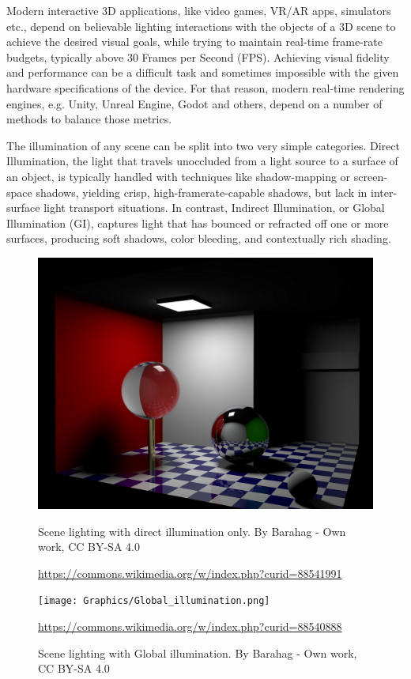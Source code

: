 Modern interactive 3D applications, like video games, VR/AR apps, simulators etc., depend on believable lighting interactions with the objects of a 3D scene to achieve the desired visual goals, while trying to maintain real-time frame-rate budgets, typically above 30 Frames per Second (FPS). Achieving visual fidelity and performance can be a difficult task and sometimes impossible with the given hardware specifications of the device. For that reason, modern real-time rendering engines, e.g. Unity, Unreal Engine, Godot and others, depend on a number of methods to balance those metrics. 

The illumination of any scene can be split into two very simple categories. Direct Illumination, the light that travels unoccluded from a light source to a surface of an object, is typically handled with techniques like shadow-mapping or screen-space shadows, yielding crisp, high-framerate-capable shadows, but lack in inter-surface light transport situations. In contrast, Indirect Illumination, or Global Illumination (GI), captures light that has bounced or refracted off one or more surfaces, producing soft shadows, color bleeding, and contextually rich shading. 

\begin{figure}[!htb]
	\begin{minipage}{0.48\textwidth}
		\centering
		\includegraphics[scale=0.65]{Graphics/Direct_lighting.png}
		\caption{Scene lighting with direct illumination only. By Barahag - Own work, CC BY-SA 4.0}
		\url{https://commons.wikimedia.org/w/index.php?curid=88541991}
		\label{gra:Direct Illumination}
	\end{minipage}\hfill
	\begin{minipage}{0.48\textwidth}
		\centering
		\texttt{[image: Graphics/Global\_illumination.png]}
		\caption{Scene lighting with Global illumination. By Barahag - Own work, CC BY-SA 4.0}
		\url{https://commons.wikimedia.org/w/index.php?curid=88540888}
		\label{gra:Global Illumination}
	\end{minipage}
\end{figure}

